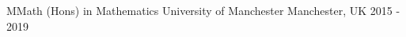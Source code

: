 
\begin{cventries}

  \cventry
  {MMath (Hons) in Mathematics} %
  {University of Manchester} %
  {Manchester, UK} %
  {2015 - 2019} %
  {
    \begin{cvitems}
    \end{cvitems}
  }
\end{cventries}
